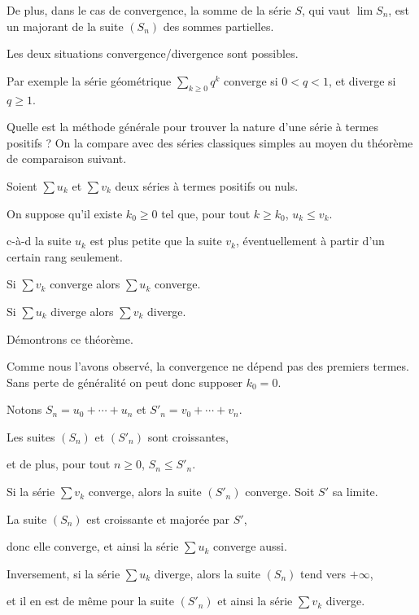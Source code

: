 \change
De plus, dans le cas de convergence, la somme de la série
$S$, qui vaut $\lim S_n$, est un majorant de la suite  $(S_n)$ des sommes partielles.

\change
Les deux situations convergence/divergence sont possibles. 

Par exemple la série géométrique
$\sum_{k\ge0} q^k$ converge si $0<q<1$, et diverge si $q \ge 1$.

\diapo

Quelle est la méthode générale pour trouver la nature d'une série à termes positifs ?
On la compare avec des séries classiques simples au moyen du théorème de comparaison suivant.

\change
Soient $\sum u_k$ et $\sum v_k$ deux séries à termes positifs ou nuls.

\change
On suppose qu'il existe $k_0\ge 0$ tel que, pour tout $k\ge k_0$, $u_k \le v_k$.

c-à-d la suite $u_k$ est plus petite que la suite $v_k$, éventuellement 
à partir d'un certain rang seulement.

\change
Si $\sum v_k$ converge alors $\sum u_k$ converge.

\change
Si $\sum u_k$ diverge alors $\sum v_k$ diverge.

\change
Démontrons ce théorème.

Comme nous l'avons observé, la convergence ne dépend pas des
premiers termes. Sans perte de généralité on peut donc supposer $k_0=0$.

\change
Notons $S_n=u_0+\cdots+u_n$ et $S'_n = v_0+\cdots+v_n$. 

\change
Les suites $(S_n)$ et $(S'_n)$ sont croissantes, 

\change
et de plus, pour tout $n \ge 0$, $S_n\le S'_n$. 

\change
Si la série $\sum v_k$ converge, alors la suite
$(S'_n)$ converge. Soit $S'$ sa limite. 

\change
La suite $(S_n)$ est croissante et majorée par $S'$, 

\change
donc elle converge, et ainsi la série $\sum u_k$
converge aussi. 

\change
Inversement, si la série $\sum u_k$ diverge, alors
la suite $(S_n)$ tend vers $+\infty$, 

\change
et il en est de même pour la
suite $(S'_n)$ et ainsi la série $\sum v_k$ diverge. 


\diapo

